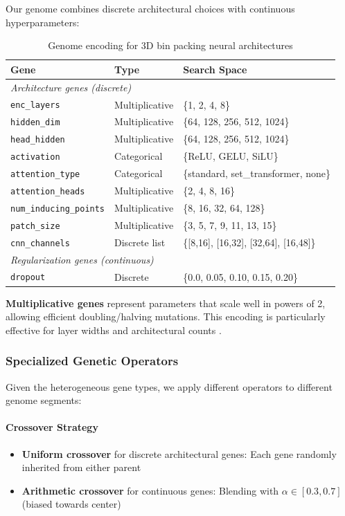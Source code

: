 Our genome combines discrete architectural choices with continuous hyperparameters:

\begin{table}[h]
\centering
\caption{Genome encoding for 3D bin packing neural architectures}
\label{tab:genome_encoding}
\begin{tabular}{lll}
\hline
\textbf{Gene} & \textbf{Type} & \textbf{Search Space} \\
\hline
\multicolumn{3}{l}{\textit{Architecture genes (discrete)}} \\
\texttt{enc\_layers} & Multiplicative & \{1, 2, 4, 8\} \\
\texttt{hidden\_dim} & Multiplicative & \{64, 128, 256, 512, 1024\} \\
\texttt{head\_hidden} & Multiplicative & \{64, 128, 256, 512, 1024\} \\
\texttt{activation} & Categorical & \{ReLU, GELU, SiLU\} \\
\texttt{attention\_type} & Categorical & \{standard, set\_transformer, none\} \\
\texttt{attention\_heads} & Multiplicative & \{2, 4, 8, 16\} \\
\texttt{num\_inducing\_points} & Multiplicative & \{8, 16, 32, 64, 128\} \\
\texttt{patch\_size} & Multiplicative & \{3, 5, 7, 9, 11, 13, 15\} \\
\texttt{cnn\_channels} & Discrete list & \{[8,16], [16,32], [32,64], [16,48]\} \\
\hline
\multicolumn{3}{l}{\textit{Regularization genes (continuous)}} \\
\texttt{dropout} & Discrete & \{0.0, 0.05, 0.10, 0.15, 0.20\} \\
\hline
\end{tabular}
\end{table}

\textbf{Multiplicative genes} represent parameters that scale well in powers of 2, allowing efficient doubling/halving mutations. This encoding is particularly effective for layer widths and architectural counts \cite{Real2017}.

\subsubsection{Specialized Genetic Operators}

Given the heterogeneous gene types, we apply different operators to different genome segments:

\paragraph{Crossover Strategy}
\begin{itemize}
    \item \textbf{Uniform crossover} for discrete architectural genes: Each gene randomly inherited from either parent
    \item \textbf{Arithmetic crossover} for continuous genes: Blending with $\alpha \in [0.3, 0.7]$ (biased towards center)
\end{itemize}

